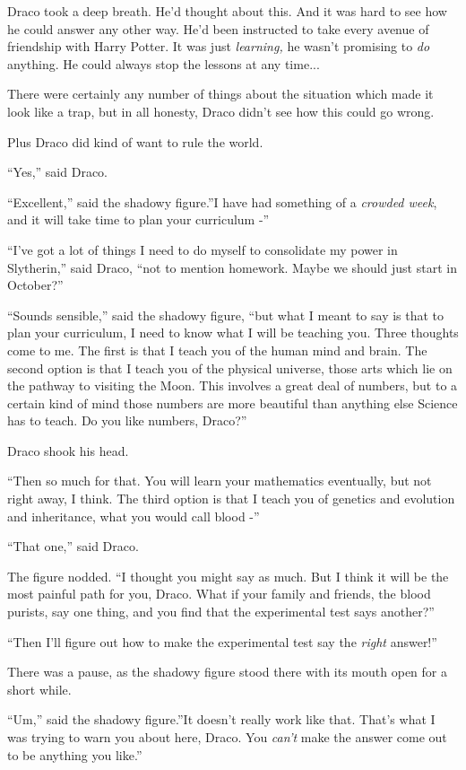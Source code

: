 Draco took a deep breath. He'd thought about this. And it was hard to
see how he could answer any other way. He'd been instructed to take
every avenue of friendship with Harry Potter. It was just
\emph{learning,} he wasn't promising to \emph{do} anything. He could
always stop the lessons at any time...

There were certainly any number of things about the situation which made
it look like a trap, but in all honesty, Draco didn't see how this could
go wrong.

Plus Draco did kind of want to rule the world.

``Yes,'' said Draco.

``Excellent,'' said the shadowy figure.''I have had something of a
\emph{crowded week}, and it will take time to plan your curriculum -''

``I've got a lot of things I need to do myself to consolidate my power
in Slytherin,'' said Draco, ``not to mention homework. Maybe we should
just start in October?''

``Sounds sensible,'' said the shadowy figure, ``but what I meant to say
is that to plan your curriculum, I need to know what I will be teaching
you. Three thoughts come to me. The first is that I teach you of the
human mind and brain. The second option is that I teach you of the
physical universe, those arts which lie on the pathway to visiting the
Moon. This involves a great deal of numbers, but to a certain kind of
mind those numbers are more beautiful than anything else Science has to
teach. Do you like numbers, Draco?''

Draco shook his head.

``Then so much for that. You will learn your mathematics eventually, but
not right away, I think. The third option is that I teach you of
genetics and evolution and inheritance, what you would call blood -''

``That one,'' said Draco.

The figure nodded. ``I thought you might say as much. But I think it
will be the most painful path for you, Draco. What if your family and
friends, the blood purists, say one thing, and you find that the
experimental test says another?''

``Then I'll figure out how to make the experimental test say the
\emph{right} answer!''

There was a pause, as the shadowy figure stood there with its mouth open
for a short while.

``Um,'' said the shadowy figure.''It doesn't really work like that.
That's what I was trying to warn you about here, Draco. You \emph{can't}
make the answer come out to be anything you like.''

